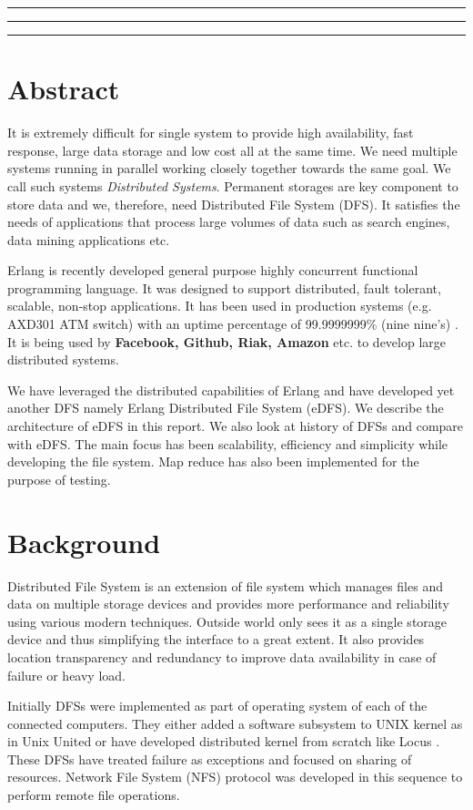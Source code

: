 \documentclass[a4paper,12pt]{article}
\begin{document}

\tableofcontents
\vspace{0.5cm}
\hrule \hrule \hrule
\newpage

\section*{Abstract}
It is extremely difficult for single system to provide high availability, fast response, large data storage and low cost all at the same time. We need multiple systems running in parallel working closely together towards the same goal. We call such systems \textit{Distributed Systems}. Permanent storages are key component to store data and we, therefore, need Distributed File System (DFS). It satisfies the needs of applications that process large volumes of data such as search engines, data mining applications etc.

Erlang \cite{erlang} is recently developed general purpose highly concurrent functional programming language. It was designed to support distributed, fault tolerant, scalable, non-stop applications. It has been used in production systems (e.g. AXD301 ATM switch) with an uptime percentage of 99.9999999\% (nine nine's) \cite[p.~170]{armstrong} \cite{blog_joe}. It is being used by \textbf{Facebook, Github, Riak, Amazon} etc. to develop large distributed systems.

We have leveraged the distributed capabilities of Erlang and have developed yet another DFS namely Erlang Distributed File System (eDFS). We describe the architecture of eDFS in this report. We also look at history of DFSs and compare with eDFS. The main focus has been scalability, efficiency and simplicity while developing the file system. Map reduce has also been implemented for the purpose of testing.

\section{Background}
Distributed File System is an extension of file system which manages files and data on multiple storage devices and provides more performance and reliability using various modern techniques. Outside world only sees it as a single storage device and thus simplifying the interface to a great extent. It also provides location transparency and redundancy to improve data availability in case of failure or heavy load.

Initially DFSs were implemented as part of operating system of each of the connected computers. They either added a software subsystem to UNIX kernel as in Unix United \cite[p.~342]{old_dfs}  or have developed distributed kernel from scratch like Locus \cite[p.~345]{old_dfs}. These DFSs have treated failure as exceptions and focused on sharing of resources. Network File System (NFS) protocol \cite[p.~351]{old_dfs} was developed in this sequence to perform remote file operations.
\end{document}
